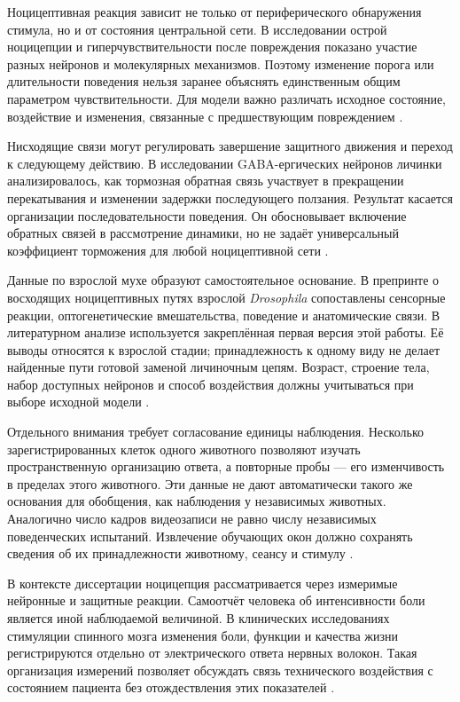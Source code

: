 Ноцицептивная реакция зависит не только от периферического обнаружения стимула, но и от состояния центральной сети. В исследовании острой ноцицепции и гиперчувствительности после повреждения показано участие разных нейронов и молекулярных механизмов. Поэтому изменение порога или длительности поведения нельзя заранее объяснять единственным общим параметром чувствительности. Для модели важно различать исходное состояние, воздействие и изменения, связанные с предшествующим повреждением \cite{s901}.

Нисходящие связи могут регулировать завершение защитного движения и переход к следующему действию. В исследовании GABA-ергических нейронов личинки анализировалось, как тормозная обратная связь участвует в прекращении перекатывания и изменении задержки последующего ползания. Результат касается организации последовательности поведения. Он обосновывает включение обратных связей в рассмотрение динамики, но не задаёт универсальный коэффициент торможения для любой ноцицептивной сети \cite{s910}.

Данные по взрослой мухе образуют самостоятельное основание. В препринте о восходящих ноцицептивных путях взрослой \textit{Drosophila} сопоставлены сенсорные реакции, оптогенетические вмешательства, поведение и анатомические связи. В литературном анализе используется закреплённая первая версия этой работы. Её выводы относятся к взрослой стадии; принадлежность к одному виду не делает найденные пути готовой заменой личиночным цепям. Возраст, строение тела, набор доступных нейронов и способ воздействия должны учитываться при выборе исходной модели \cite{s029}.

Отдельного внимания требует согласование единицы наблюдения. Несколько зарегистрированных клеток одного животного позволяют изучать пространственную организацию ответа, а повторные пробы --- его изменчивость в пределах этого животного. Эти данные не дают автоматически такого же основания для обобщения, как наблюдения у независимых животных. Аналогично число кадров видеозаписи не равно числу независимых поведенческих испытаний. Извлечение обучающих окон должно сохранять сведения об их принадлежности животному, сеансу и стимулу \cite{s212,s910}.

В контексте диссертации ноцицепция рассматривается через измеримые нейронные и защитные реакции. Самоотчёт человека об интенсивности боли является иной наблюдаемой величиной. В клинических исследованиях стимуляции спинного мозга изменения боли, функции и качества жизни регистрируются отдельно от электрического ответа нервных волокон. Такая организация измерений позволяет обсуждать связь технического воздействия с состоянием пациента без отождествления этих показателей \cite{s780,s781}.


